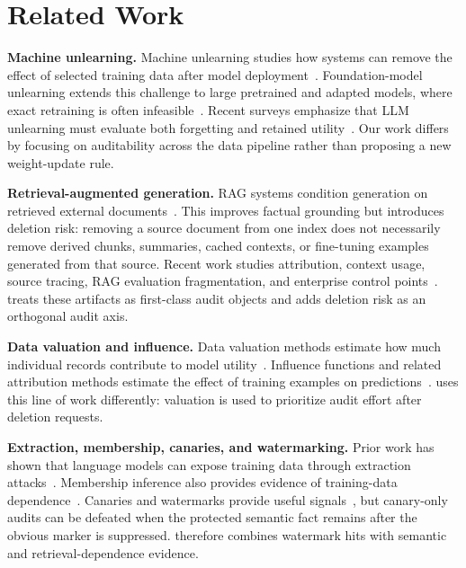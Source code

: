 \section{Related Work}

\textbf{Machine unlearning.}
Machine unlearning studies how systems can remove the effect of selected training data after model deployment~\cite{cao2015machineunlearning,bourtoule2021machineunlearning,ginart2019making}. Foundation-model unlearning extends this challenge to large pretrained and adapted models, where exact retraining is often infeasible~\cite{yao2024largeunlearning,maini2024tofu,liu2024rethinking,wang2024llmunlearning}. Recent surveys emphasize that LLM unlearning must evaluate both forgetting and retained utility~\cite{jin2024surveyunlearning}. Our work differs by focusing on auditability across the data pipeline rather than proposing a new weight-update rule.

\textbf{Retrieval-augmented generation.}
RAG systems condition generation on retrieved external documents~\cite{lewis2020rag,karpukhin2020dpr,izacard2021fid,gao2024ragsurvey}. This improves factual grounding but introduces deletion risk: removing a source document from one index does not necessarily remove derived chunks, summaries, cached contexts, or fine-tuning examples generated from that source. Recent work studies attribution, context usage, source tracing, RAG evaluation fragmentation, and enterprise control points~\cite{gao2023retrievalaugmented,asai2024selfrag,yu2024ragevalsurvey,akkiraju2024facts}. \method{} treats these artifacts as first-class audit objects and adds deletion risk as an orthogonal audit axis.

\textbf{Data valuation and influence.}
Data valuation methods estimate how much individual records contribute to model utility~\cite{ghorbani2019datashapley,jia2019data,kwon2021betashapley,wang2023databanzhaf}. Influence functions and related attribution methods estimate the effect of training examples on predictions~\cite{koh2017influence,pruthi2020tracin,feldman2020memorization,ilyas2022datamodels}. \method{} uses this line of work differently: valuation is used to prioritize audit effort after deletion requests.

\textbf{Extraction, membership, canaries, and watermarking.}
Prior work has shown that language models can expose training data through extraction attacks~\cite{carlini2021extracting,carlini2019secretsharer,carlini2023quantifying}. Membership inference also provides evidence of training-data dependence~\cite{shokri2017membership,yeom2018privacy,mattern2023membership}. Canaries and watermarks provide useful signals~\cite{kirchenbauer2023watermark,zhao2023watermarksurvey}, but canary-only audits can be defeated when the protected semantic fact remains after the obvious marker is suppressed. \method{} therefore combines watermark hits with semantic and retrieval-dependence evidence.

